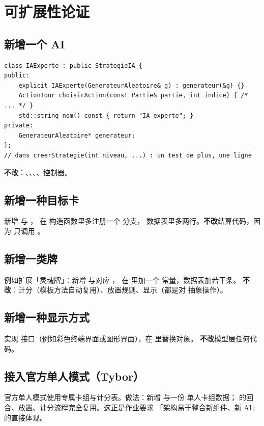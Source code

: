 \section{可扩展性论证}

\subsection{新增一个 AI}
\begin{lstlisting}
class IAExperte : public StrategieIA {
public:
    explicit IAExperte(GenerateurAleatoire& g) : generateur(&g) {}
    ActionTour choisirAction(const Partie& partie, int indice) { /* ... */ }
    std::string nom() const { return "IA experte"; }
private:
    GenerateurAleatoire* generateur;
};
// dans creerStrategie(int niveau, ...) : un test de plus, une ligne
\end{lstlisting}
\textbf{不改}：、、、、控制器。

\subsection{新增一种目标卡}
新增  与 ，
在  构造函数里多注册一个  分支，
数据表里多两行。\textbf{不改}结算代码，因为  只调用
。

\subsection{新增一类牌}
例如扩展「灵魂牌」：新增  与对应 ，
在  里加一个  常量，数据表加若干条。
\textbf{不改}：计分（模板方法自动复用）、放置规则、显示（都是对  抽象操作）。

\subsection{新增一种显示方式}
实现  接口（例如彩色终端界面或图形界面），在  里替换对象。
\textbf{不改}模型层任何代码。

\subsection{接入官方单人模式（Tybor）}
官方单人模式使用专属卡组与计分表。做法：新增  与一份
单人卡组数据； 的回合、放置、计分流程完全复用。这正是作业要求
「架构易于整合新组件、新 AI」的直接体现。

